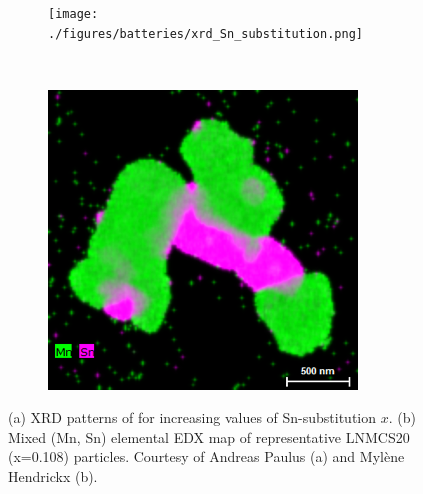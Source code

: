 \begin{refsection}
\begin{figure}[h] 
    \centering 
    \begin{subfigure}[t]{0.65\textwidth} 
        \centering 
        
\texttt{[image: ./figures/batteries/xrd\_Sn\_substitution.png]} 
       \caption{} 
    \end{subfigure}%
    ~  
    \begin{subfigure}[t]{0.34\textwidth} 
        \centering 
        
\includegraphics[width=0.9\textwidth]{./figures/batteries/edx_Sn_substitution.png} 
        \caption{} 
    \end{subfigure} 
    \caption{(a) XRD patterns of 
 for increasing values of 
Sn-substitution $x$. (b) Mixed (Mn, Sn) elemental EDX map of representative 
LNMCS20 (x=0.108) particles. Courtesy of Andreas Paulus (a) and Myl\`ene 
Hendrickx (b).} 
    \label{batteries:fig-Sn_experiment} 
\end{figure} 
 

\end{refsection}

